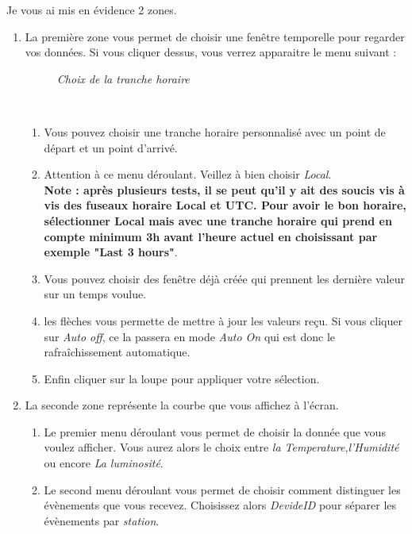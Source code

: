 Je vous ai mis en évidence 2 zones. 
\begin{enumerate}
\item La première zone vous permet de choisir une fenêtre temporelle pour regarder vos données. Si vous cliquer dessus, vous verrez apparaitre le menu suivant :\\

\begin{figure}[H]
\begin{center}
\end{center}
	\caption{ \textit{Choix de la tranche horaire}}
\end{figure}\\

\begin{enumerate}
\item Vous pouvez choisir une tranche horaire personnalisé avec un point de départ et un point d'arrivé.\\
\item Attention à ce menu déroulant. Veillez à bien choisir \textit{Local}.\\
\textbf{Note : après plusieurs tests, il se peut qu'il y ait des soucis vis à vis des fuseaux horaire Local et UTC. Pour avoir le bon horaire, sélectionner Local mais avec une tranche horaire qui prend en compte minimum 3h avant l'heure actuel en choisissant par exemple "Last 3 hours"}.\\
\item Vous pouvez choisir des fenêtre déjà créée qui prennent les dernière valeur sur un temps voulue.
\item les flèches vous permette de mettre à jour les valeurs reçu. Si vous cliquer sur \textit{Auto off}, ce la passera en mode \textit{Auto On} qui est donc le rafraîchissement automatique.
\item Enfin cliquer sur la loupe pour appliquer votre sélection.
\end{enumerate}

\item La seconde zone représente la courbe que vous affichez à l'écran.
\begin{enumerate}
\item Le premier menu déroulant vous permet de choisir la donnée que vous voulez afficher. Vous aurez alors le choix entre  \textit{la Temperature},\textit{l'Humidité} ou encore \textit{La luminosité}.
\item Le second menu déroulant vous permet de choisir comment distinguer les évènements que vous recevez. Choisissez alors \textit{DevideID} pour séparer les évènements par \textit{station}. 
\end{enumerate}
\end{enumerate}\\

